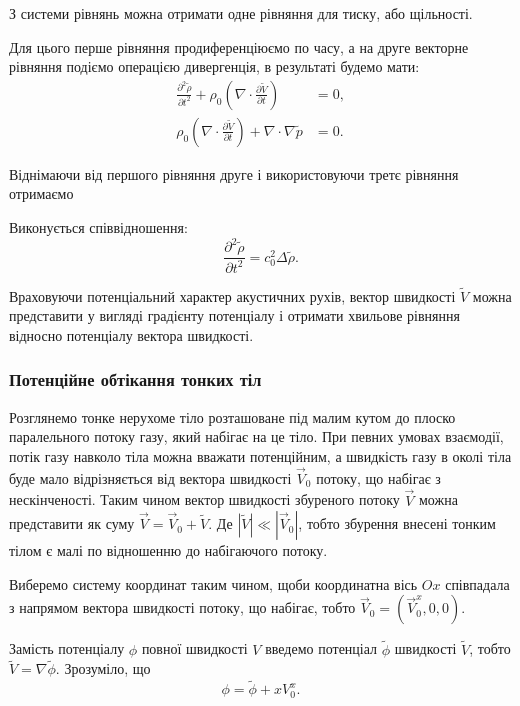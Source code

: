 З системи рівнянь можна отримати одне рівняння для тиску, або щільності. \medskip

Для цього перше рівняння продиференціюємо по часу, а на друге векторне рівняння подіємо операцією дивергенція, в результаті будемо мати:
\begin{align}
	\frac{\partial^2 \tilde \rho}{\partial t^2} + \rho_0 \left( \nabla \cdot \frac{\partial \tilde V}{\partial t} \right) &= 0, \\
	\rho_0 \left( \nabla \cdot \frac{\partial \tilde V}{\partial t} \right) + \nabla \cdot \nabla \tilde p &= 0.
\end{align}

Віднімаючи від першого рівняння друге і використовуючи третє рівняння отримаємо
\begin{th_equation}[хвильове]
	Виконується співвідношення:
	\begin{equation}
		\frac{\partial^2 \tilde \rho}{\partial t^2} = c_0^2 \Delta \tilde \rho.
	\end{equation}
\end{th_equation}

Враховуючи потенціальний характер акустичних рухів, вектор швидкості $\tilde V$ можна представити у вигляді градієнту потенціалу і отримати хвильове рівняння відносно потенціалу вектора швидкості.

\subsubsection{Потенційне обтікання тонких тіл}

Розглянемо тонке нерухоме тіло розташоване під малим кутом до плоско паралельного потоку газу, який набігає на це тіло. При певних умовах взаємодії, потік газу навколо тіла можна вважати потенційним, а швидкість газу в околі тіла буде мало відрізняється від вектора швидкості $\vec V_0$ потоку, що набігає з нескінченості. Таким чином вектор швидкості збуреного потоку $\vec V$ можна представити як суму $\vec V = \vec V_0 + \tilde V$. Де $|\tilde V| \ll |\vec V_0|$, тобто збурення внесені тонким тілом є малі по відношенню до набігаючого потоку. \medskip

Виберемо систему координат таким чином, щоби координатна вісь $Ox$ співпадала з напрямом вектора швидкості потоку, що набігає, тобто $\vec V_0 = (\vec V_0^x, 0, 0)$. \medskip

Замість потенціалу $\phi$ повної швидкості $V$ введемо потенціал $\tilde \phi$ швидкості $\tilde V$, тобто $\tilde V = \nabla \tilde \phi$. Зрозуміло, що
\begin{equation}
	\phi = \tilde \phi + x V_0^x.
\end{equation}

